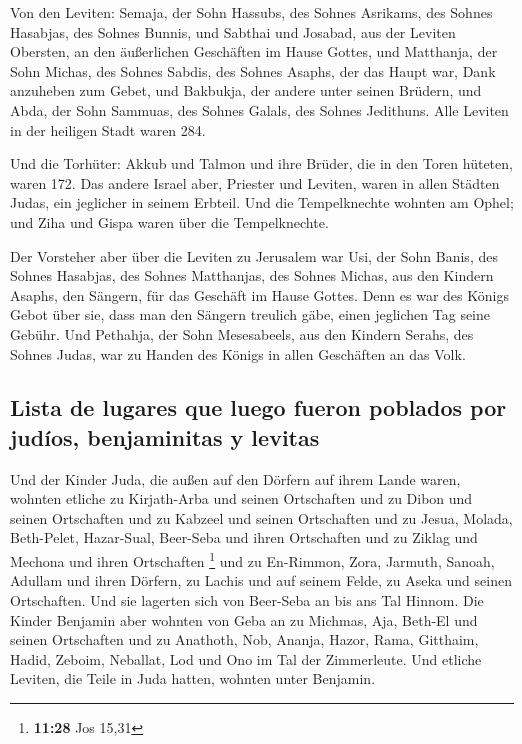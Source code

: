  Von den Leviten: Semaja, der Sohn Hassubs, des Sohnes
Asrikams, des Sohnes Hasabjas, des Sohnes Bunnis,  und
Sabthai und Josabad, aus der Leviten Obersten, an den äußerlichen
Geschäften im Hause Gottes,  und Matthanja, der Sohn
Michas, des Sohnes Sabdis, des Sohnes Asaphs, der das Haupt war, Dank
anzuheben zum Gebet, und Bakbukja, der andere unter seinen Brüdern, und
Abda, der Sohn Sammuas, des Sohnes Galals, des Sohnes Jedithuns.
 Alle Leviten in der heiligen Stadt waren 284.

 Und die Torhüter: Akkub und Talmon und ihre Brüder, die
in den Toren hüteten, waren 172.  Das andere Israel aber,
Priester und Leviten, waren in allen Städten Judas, ein jeglicher in
seinem Erbteil.  Und die Tempelknechte wohnten am Ophel;
und Ziha und Gispa waren über die Tempelknechte.

 Der Vorsteher aber über die Leviten zu Jerusalem war
Usi, der Sohn Banis, des Sohnes Hasabjas, des Sohnes Matthanjas, des
Sohnes Michas, aus den Kindern Asaphs, den Sängern, für das Geschäft im
Hause Gottes.  Denn es war des Königs Gebot über sie,
dass man den Sängern treulich gäbe, einen jeglichen Tag seine Gebühr.
 Und Pethahja, der Sohn Mesesabeels, aus den Kindern
Serahs, des Sohnes Judas, war zu Handen des Königs in allen Geschäften
an das Volk.

\hypertarget{lista-de-lugares-que-luego-fueron-poblados-por-juduxedos-benjaminitas-y-levitas}{%
\subsection{Lista de lugares que luego fueron poblados por judíos,
benjaminitas y
levitas}\label{lista-de-lugares-que-luego-fueron-poblados-por-juduxedos-benjaminitas-y-levitas}}

 Und der Kinder Juda, die außen auf den Dörfern auf ihrem
Lande waren, wohnten etliche zu Kirjath-Arba und seinen Ortschaften und
zu Dibon und seinen Ortschaften und zu Kabzeel und seinen Ortschaften
 und zu Jesua, Molada, Beth-Pelet, 
Hazar-Sual, Beer-Seba und ihren Ortschaften  und zu
Ziklag und Mechona und ihren Ortschaften \footnote{\textbf{11:28} Jos
  15,31}  und zu En-Rimmon, Zora, Jarmuth,
 Sanoah, Adullam und ihren Dörfern, zu Lachis und auf
seinem Felde, zu Aseka und seinen Ortschaften. Und sie lagerten sich von
Beer-Seba an bis ans Tal Hinnom.  Die Kinder Benjamin
aber wohnten von Geba an zu Michmas, Aja, Beth-El und seinen Ortschaften
 und zu Anathoth, Nob, Ananja,  Hazor,
Rama, Gitthaim,  Hadid, Zeboim, Neballat, 
Lod und Ono im Tal der Zimmerleute.  Und etliche Leviten,
die Teile in Juda hatten, wohnten unter Benjamin.

